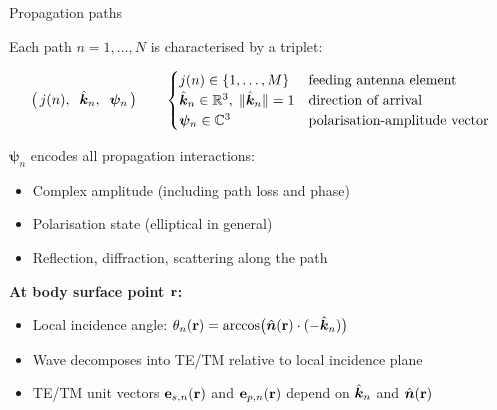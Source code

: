 \begin{frame}[label=app-p3-paths]{Propagation paths}

  {\small Each path $n = 1,\ldots,N$ is characterised by a triplet:}
  \vspace{-2pt}
  \begin{resultbox}
    \vspace{-4pt}
    \[
      \bigl(\, j(n),\;\; \hat{\bm{k}}_n,\;\; \bm{\psi}_n \,\bigr)
      \qquad
      \begin{cases}
        j(n) \in \{1,\ldots,M\} & \text{feeding antenna element}\\
        \hat{\bm{k}}_n \in \mathbb{R}^3,\; \|\hat{\bm{k}}_n\|=1 & \text{direction of arrival}\\
        \bm{\psi}_n \in \mathbb{C}^3 & \text{polarisation-amplitude vector}
      \end{cases}
    \]
  \end{resultbox}
  \vspace{0pt}
  {\small $\bm{\psi}_n$ encodes all propagation interactions:}
  \begin{itemize}\setlength\itemsep{0pt}
    \item {\small Complex amplitude (including path loss and phase)}
    \item {\small Polarisation state (elliptical in general)}
    \item {\small Reflection, diffraction, scattering along the path}
  \end{itemize}
  \vspace{-2pt}
  {\small \textbf{At body surface point $\mathbf{r}$:}}
  \begin{itemize}\setlength\itemsep{0pt}
    \item {\small Local incidence angle: $\theta_n(\mathbf{r}) = \arccos\bigl(\hat{\bm{n}}(\mathbf{r}) \cdot (-\hat{\bm{k}}_n)\bigr)$}
    \item {\small Wave decomposes into TE/TM relative to local incidence plane}
    \item {\small TE/TM unit vectors $\mathbf{e}_{s,n}(\mathbf{r})$ and $\mathbf{e}_{p,n}(\mathbf{r})$ depend on $\hat{\bm{k}}_n$ and $\hat{\bm{n}}(\mathbf{r})$}
  \end{itemize}
  \vspace{-4pt}
\end{frame}

